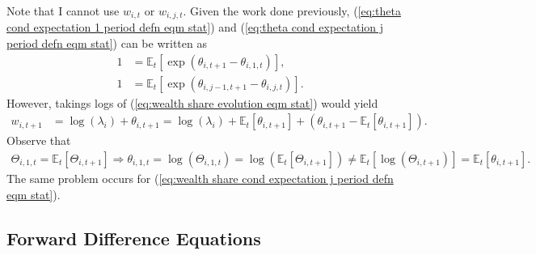 \documentclass[12 pt, oneside]{article}
\theoremstyle{definition}
\theoremstyle{definition}
\theoremstyle{definition}
\newcommand{\E}{\mathbb{E}}
\begin{document}
Note that I cannot use $w_{i, t}$ or $w_{i, j, t}$.
Given the work done previously, (\ref{eq:theta cond expectation 1 period defn eqm stat}) and (\ref{eq:theta cond expectation j period defn eqm stat}) can be written as
\begin{align*}
  1 & = \E_t[\exp(\theta_{i, t + 1} - \theta_{i, 1, t})],\\
  1 & = \E_t[\exp(\theta_{i, j - 1, t + 1} - \theta_{i, j, t})].
\end{align*}
However, takings logs of  (\ref{eq:wealth share evolution eqm stat}) would yield
\begin{align*}
  w_{i, t + 1} & = \log(\lambda_i) + \theta_{i, t + 1} = \log(\lambda_i) + \E_t[\theta_{i, t + 1}] + (\theta_{i, t + 1} - \E_t[\theta_{i, t + 1}]).
\end{align*}
Observe that
\begin{align*}
  \Theta_{i, 1, t} = \E_t[\Theta_{i, t + 1}] \Rightarrow \theta_{i, 1, t} = \log(\Theta_{i, 1, t}) = \log(\E_t[\Theta_{i, t + 1}]) \neq \E_t[\log(\Theta_{i, t + 1})] = \E_t[\theta_{i, t + 1}].
\end{align*}
The same problem occurs for (\ref{eq:wealth share cond expectation j period defn eqm stat}).


\subsection{Forward Difference Equations}
\end{document}
